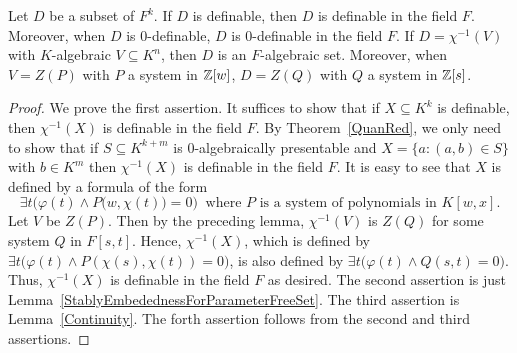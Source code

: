 \begin{thm} \label{StablyEmbbed}
Let $D$ be a subset of $F^k$. If $D$ is definable, then $D$ is definable in the field $F$. Moreover, when $D$ is $0$-definable, $D$ is $0$-definable in the field $F$. If $D = \chi^{-1}(V)$ with $K$-algebraic $V \subseteq K^n$, then $D$ is an $F$-algebraic set. Moreover, when $V = Z(P)$ with $P$ a system in $\mathbb{Z}[w]$, $D = Z(Q)$ with $Q$ a system in $\mathbb{Z}[s]$. 
\end{thm}

\begin{proof}

We prove the first assertion. It suffices to show that if $ X \subseteq K^k$ is definable, then $ \chi^{-1}(X) $ is definable in the field $F$.
By Theorem~\ref{QuanRed}, we only need to show that if $S \subseteq K^{k+m}$ is $0$-algebraically presentable and $X = \big\{a : (a,b) \in S \big\}$ with $b \in K^m$ then  $ \chi^{-1}(X) $ is definable in the field $F$. 
It is easy to see that $ X $ is defined by a formula of the form 
$$ \exists t \Big( \varphi(t) \wedge P\big(w, \chi(t)\big) = 0 \Big)\ \text{ where } P \text{ is a system of polynomials in } K[w, x].$$
Let $V$ be  $ Z(P)$. Then by the preceding lemma, $ \chi^{-1}(V) $ is $Z(Q)$ for some system $Q$ in $F[s, t]$. Hence, $ \chi^{-1}(X)$, which is defined by  $ \exists t \big( \varphi(t) \wedge P(\chi(s),\chi(t)) =0 \big) $, is also defined by $ \exists t \big( \varphi(t) \wedge Q(s,t) =0 \big)  $. Thus, $ \chi^{-1}(X)$ is definable in the field $F$ as desired.  The second assertion is just Lemma~\ref{StablyEmbedednessForParameterFreeSet}. The third assertion is Lemma~\ref{Continuity}. The forth assertion follows from the second and third assertions. 
\end{proof}